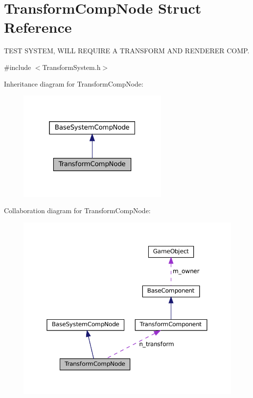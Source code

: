 \hypertarget{structTransformCompNode}{}\section{Transform\+Comp\+Node Struct Reference}
\label{structTransformCompNode}


T\+E\+ST S\+Y\+S\+T\+EM, W\+I\+LL R\+E\+Q\+U\+I\+RE A T\+R\+A\+N\+S\+F\+O\+RM A\+ND R\+E\+N\+D\+E\+R\+ER C\+O\+MP.  




{\ttfamily \#include $<$Transform\+System.\+h$>$}



Inheritance diagram for Transform\+Comp\+Node\+:\nopagebreak
\begin{figure}[H]
\begin{center}
\leavevmode
\includegraphics[width=211pt]{structTransformCompNode__inherit__graph}
\end{center}
\end{figure}


Collaboration diagram for Transform\+Comp\+Node\+:\nopagebreak
\begin{figure}[H]
\begin{center}
\leavevmode
\includegraphics[width=350pt]{structTransformCompNode__coll__graph}
\end{center}
\end{figure}
